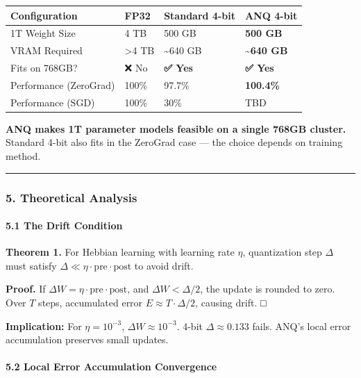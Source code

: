 \documentclass[
  11pt,
  a4paper,
]{article}
\begin{document}
\begin{longtable}[]{@{}llll@{}}
\toprule\noalign{}
Configuration & FP32 & Standard 4-bit & \textbf{ANQ 4-bit} \\
\midrule\noalign{}
\endhead
\bottomrule\noalign{}
\endlastfoot
1T Weight Size & 4 TB & 500 GB & \textbf{500 GB} \\
VRAM Required & \textgreater4 TB & \textasciitilde640 GB &
\textbf{\textasciitilde640 GB} \\
Fits on 768GB? & ❌ No & \textbf{✅ Yes} & \textbf{✅ Yes} \\
Performance (ZeroGrad) & 100\% & 97.7\% & \textbf{100.4\%} \\
Performance (SGD) & 100\% & 30\% & TBD \\
\end{longtable}

\textbf{ANQ makes 1T parameter models feasible on a single 768GB
cluster.} Standard 4-bit also fits in the ZeroGrad case --- the choice
depends on training method.

\begin{center}\rule{0.5\linewidth}{0.5pt}\end{center}

\subsubsection{5. Theoretical Analysis}\label{theoretical-analysis}

\paragraph{5.1 The Drift Condition}\label{the-drift-condition}

\textbf{Theorem 1.} For Hebbian learning with learning rate \(\eta\),
quantization step \(\Delta\) must satisfy
\(\Delta \ll \eta \cdot \text{pre} \cdot \text{post}\) to avoid drift.

\textbf{Proof.} If
\(\Delta W = \eta \cdot \text{pre} \cdot \text{post}\), and
\(\Delta W < \Delta/2\), the update is rounded to zero. Over \(T\)
steps, accumulated error \(E \approx T \cdot \Delta/2\), causing drift.
□

\textbf{Implication:} For \(\eta = 10^{-3}\),
\(\Delta W \approx 10^{-3}\). 4-bit \(\Delta \approx 0.133\) fails.
ANQ's local error accumulation preserves small updates.

\paragraph{5.2 Local Error Accumulation
Convergence}\label{local-error-accumulation-convergence}
\end{document}
